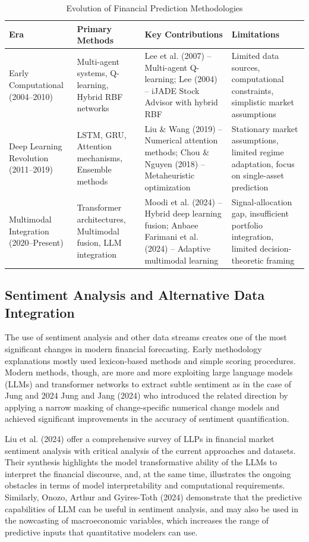 \documentclass{singlecol-new}
\theoremstyle{TH}{
\newtheorem{lemma}{Lemma}
\newtheorem{theorem}[lemma]{Theorem}
\newtheorem{corrolary}[lemma]{Corrolary}
\newtheorem{conjecture}[lemma]{Conjecture}
\newtheorem{proposition}[lemma]{Proposition}
\newtheorem{claim}[lemma]{Claim}
\newtheorem{stheorem}[lemma]{Wrong Theorem}
\newtheorem{algorithm}{Algorithm}
}
\theoremstyle{THrm}{
\newtheorem{definition}{Definition}[section]
\newtheorem{question}{Question}[section]
\newtheorem{remark}{Remark}
\newtheorem{scheme}{Scheme}
}
\theoremstyle{THhit}{
\newtheorem{case}{Case}[section]
}
\begin{document}
\begin{table}[!ht]
\centering
\caption{Evolution of Financial Prediction Methodologies}
\label{tab:methodology_evolution}
\small
\begin{tabular}{p{2.5cm}p{2.5cm}p{2.5cm}p{2.5cm}}
\hline
\textbf{Era} & \textbf{Primary Methods} & \textbf{Key Contributions} & \textbf{Limitations} \\
\hline
Early Computational (2004--2010) & Multi-agent systems, Q-learning, Hybrid RBF networks & Lee et al. (2007) -- Multi-agent Q-learning; Lee (2004) -- iJADE Stock Advisor with hybrid RBF & Limited data sources, computational constraints, simplistic market assumptions \\
\hline
Deep Learning Revolution (2011--2019) & LSTM, GRU, Attention mechanisms, Ensemble methods & Liu \& Wang (2019) -- Numerical attention methods; Chou \& Nguyen (2018) -- Metaheuristic optimization & Stationary market assumptions, limited regime adaptation, focus on single-asset prediction \\
\hline
Multimodal Integration (2020--Present) & Transformer architectures, Multimodal fusion, LLM integration & Moodi et al. (2024) -- Hybrid deep learning fusion; Anbaee Farimani et al. (2024) -- Adaptive multimodal learning & Signal-allocation gap, insufficient portfolio integration, limited decision-theoretic framing \\
\hline
\end{tabular}
\end{table}



\subsection{Sentiment Analysis and Alternative Data Integration}
The use of sentiment analysis and other data streams creates one of the most significant changes in modern financial forecasting. Early methodology explanations mostly used lexicon-based methods and simple scoring procedures. Modern methods, though, are more and more exploiting large language models (LLMs) and transformer networks to extract subtle sentiment as in the case of Jung and 2024 Jung and Jang (2024) who introduced the related direction by applying a narrow masking of change-specific numerical change models and achieved significant improvements in the accuracy of sentiment quantification.

Liu et al. (2024) offer a comprehensive survey of LLPs in financial market sentiment analysis with critical analysis of the current approaches and datasets. Their synthesis highlights the model transformative ability of the LLMs to interpret the financial discourse, and, at the same time, illustrates the ongoing obstacles in terms of model interpretability and computational requirements. Similarly, Onozo, Arthur and Gyires-Toth (2024) demonstrate that the predictive capabilities of LLM can be useful in sentiment analysis, and may also be used in the nowcasting of macroeconomic variables, which increases the range of predictive inputs that quantitative modelers can use.
\end{document}
